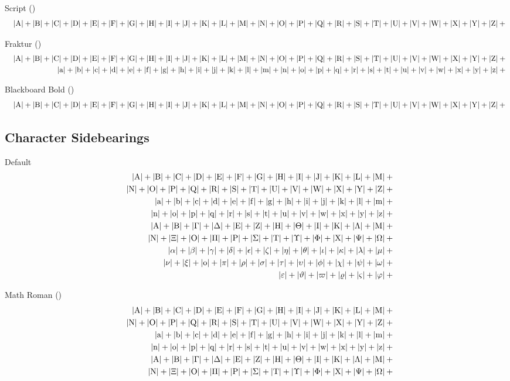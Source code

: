 \documentclass[12pt, a4paper, oneside]{article}
\theoremstyle{Plain}
\theoremstyle{Definition}
\theoremstyle{Remark}
\begin{document}
\begin{appendix}
Script (\texttt{\string\mathscr})
\def\test#1{\mathscr{#1},}
\begin{eqnarray*}
  && {\testupper}
\end{eqnarray*}%

Fraktur (\texttt{\string\mathfrak})
\def\test#1{\mathfrak{#1},}
\begin{eqnarray*}
  && {\testupper}\\
  && {\testlower}
\end{eqnarray*}%

Blackboard Bold (\texttt{\string\mathbb})
\def\test#1{\mathbb{#1},}
\begin{eqnarray*}
  && {\testupper}
\end{eqnarray*}%

\subsection{Character Sidebearings \showfamily}

Default
\def\test#1{|#1|+{}}
\begin{eqnarray*}
  && {\testupperi}\\
  && {\testupperii}\\
  && {\testloweri}\\
  && {\testlowerii}\\
  && {\testupgreeki}\\
  && {\testupgreekii}\\
  && {\testlowgreeki}\\
  && {\testlowgreekii}\\
  && {\testlowgreekiii}
\end{eqnarray*}%

Math Roman (\texttt{\string\mathrm})
\def\test#1{|\mathrm{#1}|+{}}%
\begin{eqnarray*}
  && {\testupperi}\\
  && {\testupperii}\\
  && {\testloweri}\\
  && {\testlowerii}\\
  && {\testupgreeki}\\
  && {\testupgreekii}
\end{eqnarray*}%



\end{appendix}
\end{document}
